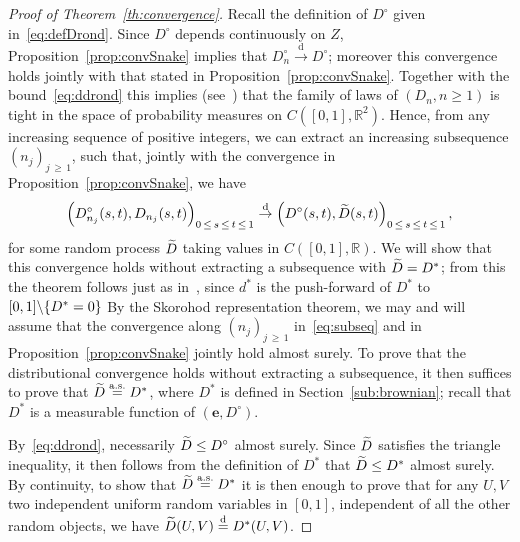 \documentclass[10pt]{amsart}
\theoremstyle{definition}\newtheorem{defi}[theo]{Definition}\newtheorem{rema}[theo]{Remark}\newtheorem{exam}[theo]{Example}\newtheorem{exem}[theo]{Example}\newtheorem{nota}[theo]{Notation}
\providecommand{\R}{}
\renewcommand{\R}{\mathbb{R}}
\newcommand{\bfe}{\mathbf{e}}
\newcommand{\eqdist}{\ensuremath{\stackrel{\mathrm{d}}{=}}}
\newcommand{\convdist}{\ensuremath{\stackrel{\mathrm{d}}{\rightarrow}}}
\newcommand{\aseq}{\ensuremath{\stackrel{\mathrm{a.s.}}{=}}}
\let\oldtilde\tilde
\renewcommand*{\tilde}[1]{\mathchoice{\widetilde{#1}}{\widetilde{#1}}{\oldtilde{#1}}{\oldtilde{#1}}}
\begin{document}
\begin{proof}[{Proof of Theorem~\ref{th:convergence}}]
Recall the definition of $D^\circ$ given in~\eqref{eq:defDrond}. Since $D^\circ$ depends continuously on $Z$, Proposition~\ref{prop:convSnake} implies that $D_n^\circ \convdist D^\circ$; moreover this convergence holds jointly with that stated in Proposition~\ref{prop:convSnake}. Together with the bound~\eqref{eq:ddrond} this implies (see~\cite[Proposition~3.2]{LeGallInventiones}) that the family of laws of $(D_n,n \ge 1)$ is tight in the space of probability measures on $C([0,1],\R^2)$. Hence, from any increasing sequence of positive integers, we can extract an increasing subsequence $(n_j)_{j\,\geq\,1}$, such that, jointly with the convergence in Proposition~\ref{prop:convSnake}, we have
\begin{equation}\label{eq:subseq}
\left(D^\circ_{n_j}(s,t),D_{n_j}(s,t)\right)_{0\,\leq\,s\,\leq\,t\,\leq\,1}\convdist \left(D^\circ(s,t),\tilde D(s,t)\right)_{0\,\leq\,s\,\leq\,t\,\leq\,1},
\end{equation}
for some random process $\tilde{D}$ taking values in $C([0,1],\R)$. We will show that this convergence holds without extracting a subsequence with $\tilde D=D^*$; from this the theorem follows just as in~\cite{LeGallUniqueness}, since $d^*$ is the push-forward of $D^*$ to $[0,1]\backslash \{D^*\linebreak=0\}$ By the Skorohod representation theorem, we may and will assume that the convergence along $(n_j)_{j\,\geq\,1}$ in~\eqref{eq:subseq} and in Proposition~\ref{prop:convSnake} jointly hold almost surely. To prove that the distributional convergence holds without extracting a subsequence, it then suffices to prove that $\tilde D\aseq D^*$, where $D^*$ is defined in Section~\ref{sub:brownian}; recall that $D^*$ is a measurable function of $(\bfe,D^\circ)$.


By~\eqref{eq:ddrond}, necessarily $\tilde D\leq D^\circ$ almost surely. Since $\tilde D$ satisfies the triangle inequality, it then follows from the definition of $D^*$ that $\tilde D\leq D^*$ almost surely. By continuity, to show that $\tilde D\aseq D^*$ it is then enough to prove that for any $U,V$ two independent uniform random variables in $[0,1]$, independent of all the other random objects, we have $\tilde D(U,V)\eqdist D^*(U,V)$.


\end{proof}
\end{document}
